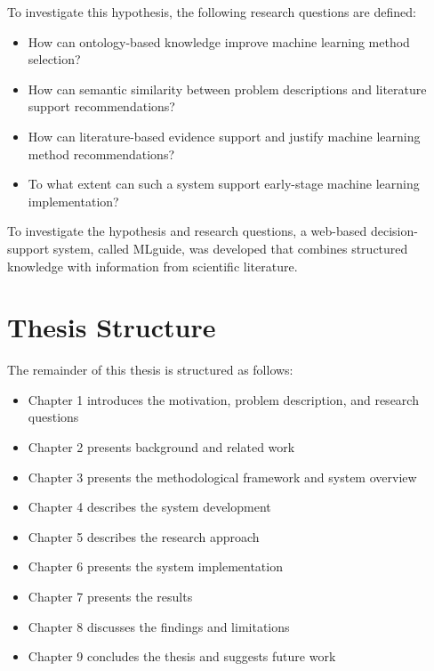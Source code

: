 To investigate this hypothesis, the following research questions 
are defined:

\begin{itemize}
    \item How can ontology-based knowledge improve machine learning method selection?
    \item How can semantic similarity between problem descriptions and literature support recommendations?
    \item How can literature-based evidence support and justify 
machine learning method recommendations?
    \item To what extent can such a system support early-stage machine learning implementation?
\end{itemize}

To investigate the hypothesis and research questions, a web-based decision-support
system, called MLguide, was developed that combines structured knowledge
with information from scientific literature.

\section{Thesis Structure}

The remainder of this thesis is structured as follows:

\begin{itemize}
    \item Chapter 1 introduces the motivation, problem description, and research questions
    \item Chapter 2 presents background and related work
    \item Chapter 3 presents the methodological framework and system overview
    \item Chapter 4 describes the system development
    \item Chapter 5 describes the research approach
    \item Chapter 6 presents the system implementation
    \item Chapter 7 presents the results
    \item Chapter 8 discusses the findings and limitations
    \item Chapter 9 concludes the thesis and suggests future work
\end{itemize}





